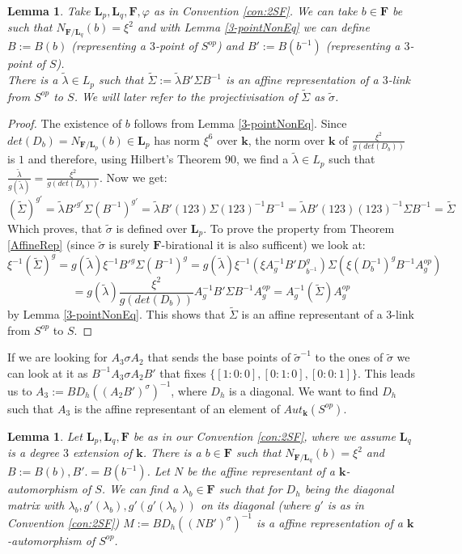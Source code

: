\documentclass[12pt, oneside, reqno]{amsart}
\newtheorem{lemma}[theorem]{Lemma}
\begin{document}
\begin{lemma} \label{BB'}
    Take $\textbf{L}_p, \textbf{L}_q, \textbf{F}, \varphi$ as in Convention \ref{con:2SF}. We can take $b \in \textbf{F}$ be such that $N_{\textbf{F} / \textbf{L}_q}(b) = \xi^{2}$ and with Lemma \ref{3-pointNonEq} we can define $B := B(b)$ (representing a $3$-point of $S^{op}$) and $B':=B(b^{-1})$ (representing a $3$-point of $S$). \\ There is a $\tilde \lambda \in L_p$ such that $\tilde \Sigma := \tilde \lambda B' \Sigma B^{-1}$ is an affine representation of a $3$-link from $S^{op}$ to $S$. We will later refer to the projectivisation of $\tilde \Sigma$ as $\tilde \sigma$.
\end{lemma}
\begin{proof}
The existence of $b$ follows from Lemma \ref{3-pointNonEq}. Since $det(D_b) = N_{\textbf{F}/\textbf{L}_p}(b) \in \textbf{L}_p$ has norm $\xi^6$ over $\textbf{k}$, the norm over $\textbf{k}$ of $\frac{\xi^2}{g(det(D_b))}$ is $1$ and therefore, using Hilbert's Theorem 90, we find a $\tilde \lambda \in L_p$ such that $\frac{\tilde \lambda}{g(\tilde \lambda)} = \frac{\xi^2}{g(det(D_b))}$. Now we get:
\[(\tilde \Sigma)^{g'} = \tilde \lambda B'^{g'} \Sigma (B^{-1})^{g'} = \tilde \lambda B' (123) \Sigma (123)^{-1} B^{-1} = \tilde \lambda B' (123) (123)^{-1} \Sigma B^{-1} = \tilde \Sigma\]
Which proves, that $\tilde \sigma$ is defined over $\textbf{L}_p$. To prove the property from Theorem \ref{AffineRep} (since $\tilde \sigma$ is surely $\textbf{F}$-birational it is also sufficent) we look at:
\[\xi^{-1}(\tilde \Sigma)^g =g(\tilde \lambda)\xi^{-1} B'^g \Sigma (B^{-1})^g =g(\tilde \lambda) \xi^{-1} (\xi A_g^{-1} B' D_{b^{-1}}^g) \Sigma (\xi (D_{b}^{-1})^g B^{-1} A_g^{op})\] \[ = g(\tilde \lambda) \frac{\xi^2}{g(det(D_b))} A_g^{-1} B' \Sigma B^{-1}A_g^{op} = A_g^{-1}(\tilde \Sigma)A_g^{op}\]
by Lemma \ref{3-pointNonEq}. This shows that $\tilde \Sigma$ is an affine representant of a $3$-link from $S^{op}$ to $S$.
\end{proof}
\noindent
If we are looking for $A_3 \sigma A_2$ that sends the base points of $\tilde \sigma^{-1}$ to the ones of $\tilde \sigma$ we can look at it as $B^{-1} A_3 \sigma A_2 B'$ that fixes $\{ [1:0:0], [0:1:0], [0:0:1]\}$. This leads us to $A_3 := B D_h ((A_2B')^{\sigma})^{-1}$, where $D_h$ is a diagonal. We want to find $D_h$ such that $A_3$ is the affine representant of an element of $Aut_{\textbf{k}}(S^{op})$.
\begin{lemma} \label{A3}
    Let $\textbf{L}_p, \textbf{L}_q,\textbf{F}$ be as in our Convention \ref{con:2SF}, where we assume $\textbf{L}_q$ is a degree $3$ extension of $\textbf{k}$. There is a $b \in \textbf{F}$ such that $N_{\textbf{F}/\textbf{L}_q}(b) = \xi^2$ and $B:= B(b), B'.= B(b^{-1})$. Let $N$ be the affine representant of a $\textbf{k}$-automorphism of $S$. We can find a $\lambda_b \in \textbf{F}$ such that for $D_h$ being the diagonal matrix with $\lambda_b, g'(\lambda_b), g'(g'(\lambda_b))$ on its diagonal (where $g'$ is as in Convention \ref{con:2SF}) $M := B D_h ((NB')^{\sigma})^{-1}$ is a affine representation of a $\textbf{k}$-automorphism of $S^{op}$.
\end{lemma}
\end{document}
